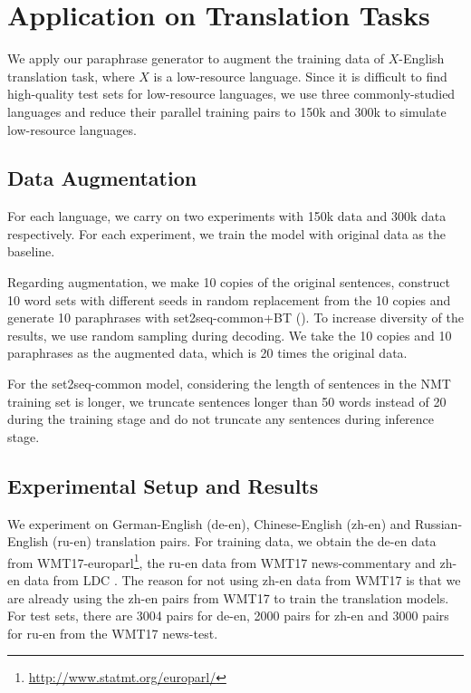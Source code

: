 \section{Application on Translation Tasks} \label{sec:app}
We apply our paraphrase generator to augment the training data of $X$-English 
translation task, where $X$ is a low-resource language. 
Since it is difficult to find high-quality test sets for low-resource 
languages, we use three commonly-studied languages and reduce their 
parallel training pairs to 150k and 300k to simulate low-resource languages. 

\subsection{Data Augmentation}

For each language, we carry on two experiments with 150k data and 300k data 
respectively. For each experiment, we train the model with original data 
as the baseline. 

Regarding augmentation, we make 10 copies of the original sentences, 
construct 10 word sets with different seeds in random replacement from the 10 copies and generate 10 paraphrases 
with set2seq-common+BT (). To increase diversity of the results, 
we use random sampling \citep{edunov2018understanding} during decoding. 
We take the 10 copies and 10 paraphrases as the augmented data, which is 
20 times the original data.

For the set2seq-common model, considering the length of sentences 
in the NMT training set is longer, we truncate sentences longer 
than 50 words instead of 20 during the training stage and 
do not truncate any sentences during inference stage.

\subsection{Experimental Setup and Results}
We experiment on German-English (de-en), Chinese-English (zh-en) and Russian-English (ru-en) translation pairs. For training data, we obtain the de-en data from WMT17-europarl\footnote{\url{http://www.statmt.org/europarl/}}\citep{koehn2005europarl}, the ru-en data from WMT17 news-commentary and zh-en data from LDC \citep{liberman2002emotional,huang2002multiple}. The reason for not using zh-en data from WMT17 is that we are already using the zh-en pairs from WMT17 to train 
the translation models.
For test sets, there are 3004 pairs for de-en, 2000 pairs for zh-en and 
3000 pairs for ru-en from the WMT17 news-test.

